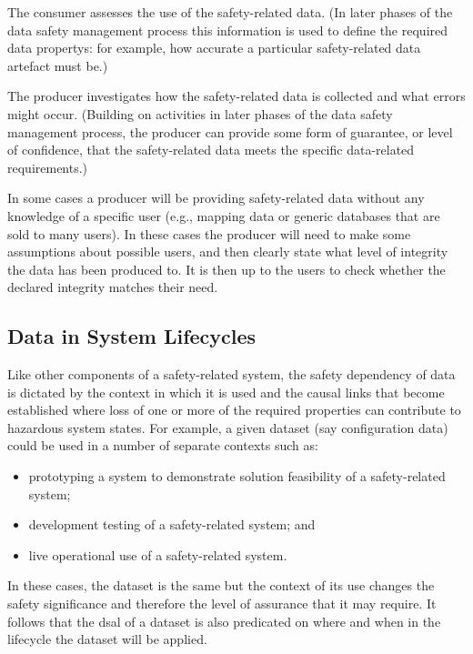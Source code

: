 The consumer assesses the use of the safety-related data. (In later phases of the data safety management process this \gls{information} is used to define the required \glspl{data property}: for example, how accurate a particular safety-related \gls{data artefact} must be.)

The producer investigates how the safety-related data is collected and what errors might occur. (Building on activities in later phases of the data safety management process, the producer can provide some form of guarantee, or level of confidence, that the safety-related data meets the specific data-related requirements.)

In some cases a producer will be providing safety-related data without any knowledge of a specific user (e.g., mapping data or generic \glspl{database} that are sold to many users). In these cases the producer will need to make some assumptions about possible users, and then clearly state what level of \gls{integrity} the data has been produced to. It is then up to the users to check whether the declared \gls{integrity} matches their need.

\subsection{Data in System Lifecycles}
Like other components of a safety-related system, the safety dependency of data is dictated by the context in which it is used and the causal links that become established where loss of one or more of the required properties can contribute to hazardous system states. For example, a given \gls{dataset} (say \gls{configuration data}) could be used in a number of separate contexts such as:
\begin{itemize}
  \item prototyping a system to demonstrate solution feasibility of a safety-related system;
  \item development testing of a safety-related system; and
  \item live operational use of a safety-related system.
\end{itemize}

In these cases, the \gls{dataset} is the same but the context of its use changes the safety significance and therefore the level of assurance that it may require. It follows that the \gls{dsal} of a \gls{dataset} is also predicated on where and when in the lifecycle the \gls{dataset} will be applied. 

